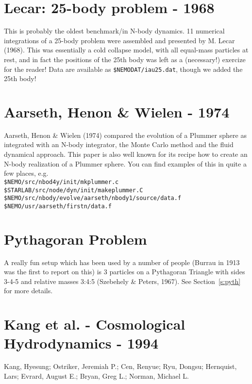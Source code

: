 \section{Lecar: 25-body problem - 1968}

This is probably the oldest benchmark/in N-body dynamics.
11 numerical integrations of a 25-body problem were assembled and presented
by M. Lecar (1968).
This was essentially a cold collapse model, with all equal-mass 
particles at rest, and
in fact the positions of the 25th body was left as a (necessary!)
exercize for the reader!
Data are available as {\tt \$NEMODAT/iau25.dat}, though we added the 25th body!

\section{Aarseth, Henon \& Wielen - 1974}

Aarseth, Henon \& Wielen (1974) compared the evolution of a 
Plummer sphere as integrated with an N-body integrator,
the Monte Carlo method and the fluid dynamical approach.
This paper is also well known for its recipe how to create
an N-body realization of a Plummer sphere. You can find examples
of this in quite a few places, e.g.\\
{\tt \$NEMO/src/nbod4y/init/mkplummer.c}\\
{\tt \$STARLAB/src/node/dyn/init/makeplummer.C}\\
{\tt \$NEMO/src/nbody/evolve/aarseth/nbody1/source/data.f}\\
{\tt \$NEMO/usr/aarseth/firstn/data.f}


\section{Pythagoran Problem}

A really fun setup which has been used by a number of people
(Burrau in 1913 was the first to report on this)
is 3 particles on a Pythagoran Triangle with sides 3-4-5 
and relative masses 3:4:5 (Szebehely \& Peters, 1967).
See Section~\ref{s:pyth} for more details. 


\section{Kang et al. - Cosmological Hydrodynamics - 1994}


Kang, Hyesung; Ostriker, Jeremiah P.; Cen, Renyue; Ryu, Dongsu;
Hernquist, Lars; Evrard, August E.; Bryan, Greg L.; Norman, Michael L.

